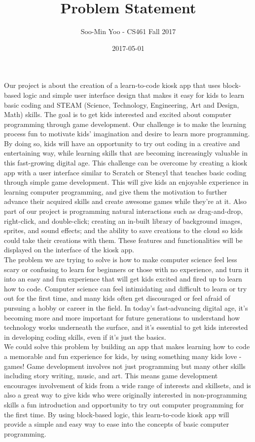 \documentclass[10pt,draftclsnofoot,onecolumn,letterpaper]{IEEEtran}
\begin{document}
\title{Problem Statement}
\author{Soo-Min Yoo - CS461 Fall 2017}
\date{2017-05-01}
\maketitle{}

Our project is about the creation of a learn-to-code kiosk app that uses block-based logic and simple user interface design that makes it easy for kids to learn basic coding and STEAM (Science, Technology, Engineering, Art and Design, Math) skills. The goal is to get kids interested and excited about computer programming through game development. Our challenge is to make the learning process fun to motivate kids' imagination and desire to learn more programming. By doing so, kids will have an opportunity to try out coding in a creative and entertaining way, while learning skills that are becoming increasingly valuable in this fast-growing digital age.
This challenge can be overcome by creating a kiosk app with a user interface similar to Scratch or Stencyl that teaches basic coding through simple game development. This will give kids an enjoyable experience in learning computer programming, and give them the motivation to further advance their acquired skills and create awesome games while they're at it. Also part of our project is programming natural interactions such as drag-and-drop, right-click, and double-click; creating an in-built library of background images, sprites, and sound effects; and the ability to save creations to the cloud so kids could take their creations with them. These features and functionalities will be displayed on the interface of the kiosk app. \\

The problem we are trying to solve is how to make computer science feel less scary or confusing to learn for beginners or those with no experience, and turn it into an easy and fun experience that will get kids excited and fired up to learn how to code. Computer science can feel intimidating and difficult to learn or try out for the first time, and many kids often get discouraged or feel afraid of pursuing a hobby or career in the field. In today's fast-advancing digital age, it's becoming more and more important for future generations to understand how technology works underneath the surface, and it's essential to get kids interested in developing coding skills, even if it's just the basics. \\

We could solve this problem by building an app that makes learning how to code a memorable and fun experience for kids, by using something many kids love - games! Game development involves not just programming but many other skills including story writing, music, and art. This means game development encourages involvement of kids from a wide range of interests and skillsets, and is also a great way to give kids who were originally interested in non-programming skills a fun introduction and opportunity to try out computer programming for the first time. By using block-based logic, this learn-to-code kiosk app will provide a simple and easy way to ease into the concepts of basic computer programming. \\
\end{document}
